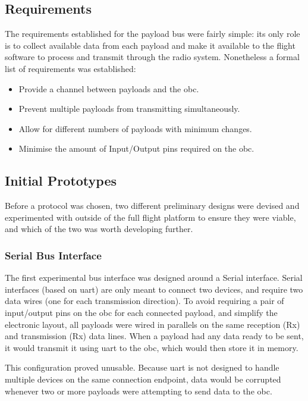 \subsection{Requirements}

The requirements established for the payload bus were fairly simple: its only
role is to collect available data from each payload and make it available to
the flight software to process and transmit through the radio system.
Nonetheless a formal list of requirements was established:

\begin{itemize}
\item Provide a channel between payloads and the \acrshort{obc}.
\item Prevent multiple payloads from transmitting simultaneously.
\item Allow for different numbers of payloads with minimum changes.
\item Minimise the amount of Input/Output pins required on the \acrshort{obc}.
\end{itemize}

\subsection{Initial Prototypes}

Before a protocol was chosen, two different preliminary designs were devised
and experimented with outside of the full flight platform to ensure they were
viable, and which of the two was worth developing further.

\subsubsection{Serial Bus Interface}

The first experimental bus interface was designed around a Serial interface.
Serial interfaces (based on \acrshort{uart}) are only meant to connect two
devices, and require two data wires (one for each transmission direction). To
avoid requiring a pair of input/output pins on the \acrlong{obc} for each
connected payload, and simplify the electronic layout, all payloads were wired
in parallels on the same reception (Rx) and transmission (Rx) data lines. When
a payload had any data ready to be sent, it would transmit it using
\acrshort{uart} to the \acrshort{obc}, which would then store it in memory.

This configuration proved unusable. Because \acrshort{uart} is not designed
to handle multiple devices on the same connection endpoint, data would be
corrupted whenever two or more payloads were attempting to send data to the
\acrshort{obc}.

